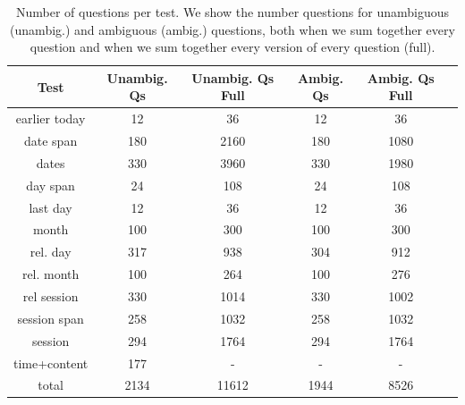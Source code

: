 \documentclass{article}
\begin{document}
\begin{table}
  \centering
  \begin{tabular}{cccccc}
    \toprule    
    \textbf{Test} & \textbf{Unambig. Qs} & \textbf{Unambig. Qs Full} & \textbf{Ambig. Qs} & \textbf{Ambig. Qs Full}\\
    \midrule
    earlier today & 12 & 36 & 12 & 36\\
    date span & 180 & 2160 & 180 & 1080\\
    dates & 330 & 3960 & 330 & 1980\\
    day span & 24 & 108 & 24 & 108\\
    last day & 12 & 36 & 12 & 36\\
    month & 100 & 300 & 100 & 300\\
    rel. day & 317& 938 & 304 & 912\\
    rel. month& 100 & 264 & 100 & 276\\
    rel session & 330 & 1014 & 330 & 1002\\
    session span & 258 & 1032 & 258 & 1032\\
    session & 294 & 1764 & 294 & 1764\\
    time+content & 177 & - & - & -\\
    total   &2134 & 11612& 1944 & 8526\\
    \bottomrule
  \end{tabular}
  \caption{Number of questions per test. We show the number questions for unambiguous (unambig.) and ambiguous (ambig.) questions, both when we sum together every question and when we sum together every version of every question (full). }\label{fig:number_qs_dataset}
\end{table}
\end{document}
